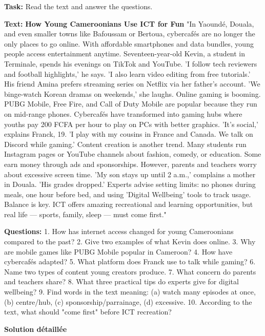 \documentclass[11pt]{article}
\begin{document}
\begin{exoresolu}
\textbf{Task:} Read the text and answer the questions.

\textbf{Text:}
\textbf{How Young Cameroonians Use ICT for Fun}
"In Yaoundé, Douala, and even smaller towns like Bafoussam or Bertoua, cybercafés are no longer the only places to go online. With affordable smartphones and data bundles, young people access entertainment anytime. Seventeen-year-old Kevin, a student in Terminale, spends his evenings on TikTok and YouTube. 'I follow tech reviewers and football highlights,' he says. 'I also learn video editing from free tutorials.' His friend Amina prefers streaming series on Netflix via her father's account. 'We binge-watch Korean dramas on weekends,' she laughs.
Online gaming is booming. PUBG Mobile, Free Fire, and Call of Duty Mobile are popular because they run on mid-range phones. Cybercafés have transformed into gaming hubs where youths pay 200 FCFA per hour to play on PCs with better graphics. 'It's social,' explains Franck, 19. 'I play with my cousins in France and Canada. We talk on Discord while gaming.'
Content creation is another trend. Many students run Instagram pages or YouTube channels about fashion, comedy, or education. Some earn money through ads and sponsorships. However, parents and teachers worry about excessive screen time. 'My son stays up until 2 a.m.,' complains a mother in Douala. 'His grades dropped.' Experts advise setting limits: no phones during meals, one hour before bed, and using 'Digital Wellbeing' tools to track usage. Balance is key. ICT offers amazing recreational and learning opportunities, but real life — sports, family, sleep — must come first."

\textbf{Questions:}
1. How has internet access changed for young Cameroonians compared to the past?
2. Give two examples of what Kevin does online.
3. Why are mobile games like PUBG Mobile popular in Cameroon?
4. How have cybercafés adapted?
5. What platform does Franck use to talk while gaming?
6. Name two types of content young creators produce.
7. What concern do parents and teachers share?
8. What three practical tips do experts give for digital wellbeing?
9. Find words in the text meaning: (a) watch many episodes at once, (b) centre/hub, (c) sponsorship/parrainage, (d) excessive.
10. According to the text, what should "come first" before ICT recreation?

\tcblower
\textbf{Solution détaillée}


\end{exoresolu}
\end{document}
